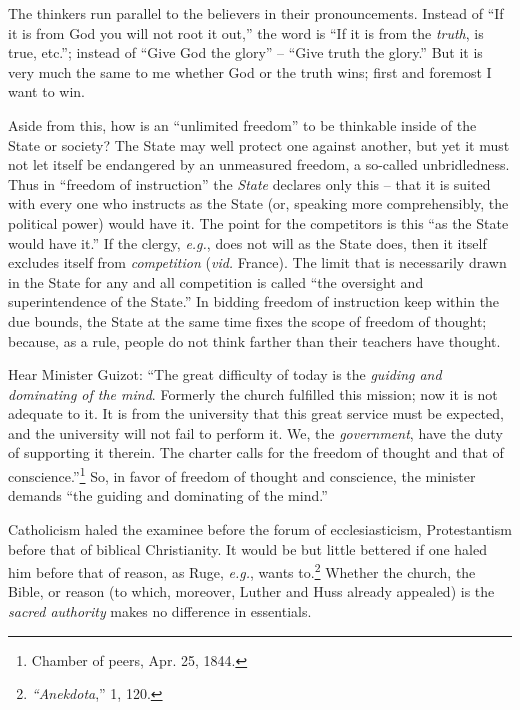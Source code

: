 \documentclass[12pt,a4paper]{book}
\begin{document}
The thinkers run parallel to the believers in their pronouncements. Instead of 
``If it is from God you will not root it out,'' the word is ``If it is from 
the \textit{truth}, is true, etc.''; instead of ``Give God the glory'' -- 
``Give truth the glory.'' But it is very much the same to me whether God or 
the truth wins; first and foremost I want to win.

Aside from this, how is an ``unlimited freedom'' to be thinkable inside of 
the State or society? The State may well protect one against another, but yet 
it must not let itself be endangered by an unmeasured freedom, a so-called 
unbridledness. Thus in ``freedom of instruction'' the \textit{State} 
declares only this -- that it is suited with every one who instructs as the 
State (or, speaking more comprehensibly, the political power) would have it. 
The point for the competitors is this ``as the State would have it.'' If the 
clergy, \textit{e.g.}, does not will as the State does, then it itself 
excludes itself from \textit{competition} (\textit{vid.} France). The limit 
that is necessarily drawn in the State for any and all competition is called 
``the oversight and superintendence of the State.'' In bidding freedom of 
instruction keep within the due bounds, the State at the same time fixes the 
scope of freedom of thought; because, as a rule, people do not think farther 
than their teachers have thought.

Hear Minister Guizot: ``The great difficulty of today is the \textit{guiding 
and dominating of the mind}. Formerly the church fulfilled this mission; now 
it is not adequate to it. It is from the university that this great service 
must be expected, and the university will not fail to perform it. We, the 
\textit{government}, have the duty of supporting it therein. The charter calls 
for the freedom of thought and that of conscience.''\footnote{Chamber of 
peers, Apr. 25, 1844.} So, in favor of freedom of thought and conscience, the 
minister demands ``the guiding and dominating of the mind.''

Catholicism haled the examinee before the forum of ecclesiasticism, 
Protestantism before that of biblical Christianity. It would be but little 
bettered if one haled him before that of reason, as Ruge, \textit{e.g.}, 
wants to.\footnote{\textit{``Anekdota},'' 1, 120.} Whether the church, the 
Bible, or reason (to which, moreover, Luther and Huss already appealed) is the 
\textit{sacred authority} makes no difference in essentials.
\end{document}

